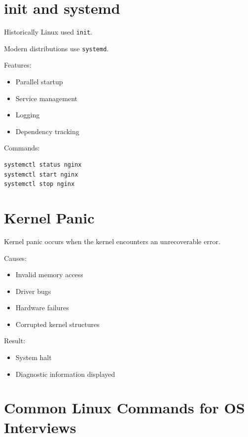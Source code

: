 \section{init and systemd}

Historically Linux used \texttt{init}.

Modern distributions use \texttt{systemd}.

Features:

\begin{itemize}
\item Parallel startup
\item Service management
\item Logging
\item Dependency tracking
\end{itemize}

Commands:

\begin{lstlisting}[style=interviewcode]
systemctl status nginx
systemctl start nginx
systemctl stop nginx
\end{lstlisting}

\section{Kernel Panic}

Kernel panic occurs when the kernel encounters an unrecoverable error.

Causes:

\begin{itemize}
\item Invalid memory access
\item Driver bugs
\item Hardware failures
\item Corrupted kernel structures
\end{itemize}

Result:

\begin{itemize}
\item System halt
\item Diagnostic information displayed
\end{itemize}

\section{Common Linux Commands for OS Interviews}

